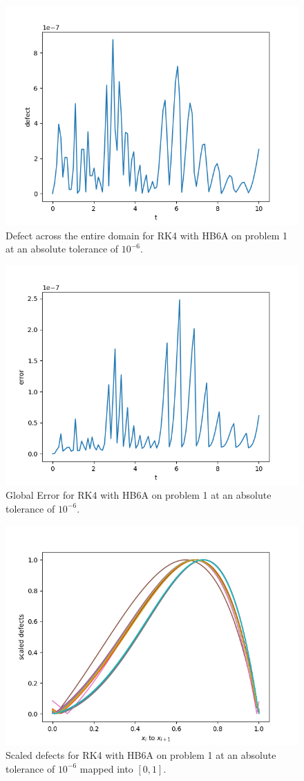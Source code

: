 \begin{figure}[H]
\centering
\includegraphics[width=0.7\linewidth]{./figures/rk4_with_hb6_asympt_p1_global_defect}
\caption{Defect across the entire domain for RK4 with HB6A on problem 1 at an absolute tolerance of $10^{-6}$.}
\label{fig:rk4_with_hb6_asympt_p1_global_defect}
\end{figure}

\begin{figure}[H]
\centering
\includegraphics[width=0.7\linewidth]{./figures/rk4_with_hb6_asympt_p1_global_error}
\caption{Global Error for RK4 with HB6A on problem 1 at an absolute tolerance of $10^{-6}$.}
\label{fig:rk4_with_hb6_asympt_p1_global_error}
\end{figure}

\begin{figure}[H]
\centering
\includegraphics[width=0.7\linewidth]{./figures/rk4_with_hb6_asympt_p1_scaled_defects}
\caption{Scaled defects for RK4 with HB6A on problem 1 at an absolute tolerance of $10^{-6}$ mapped into $[0, 1]$.}
\label{fig:rk4_with_hb6_asympt_p1_scaled_defects}
\end{figure}

